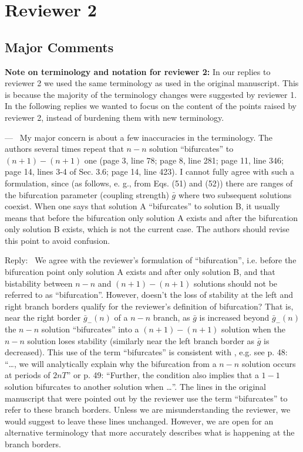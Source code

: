 \documentclass[utf8]{article}
\newcounter{point}[section]
\newenvironment{point}
{\refstepcounter{point} \bigskip \noindent {\textbf{Point~P\thesubsection.\arabic{point}} } ---\ }
{\par }
\newenvironment{reply}
{\medskip \noindent Reply:\  }
		{\medskip}
\begin{document}
\section{Reviewer 2}
\label{sec:r2}
\subsection{Major Comments}
\textbf{Note on terminology and notation for reviewer 2:} In our replies to reviewer 2 we used the same terminology as used in the original manuscript. This is because the majority of the terminology changes were suggested by reviewer 1. In the following replies we wanted to focus on the content of the points raised by reviewer 2, instead of burdening them with new terminology.
\setcounter{point}{0}

\begin{point}
My major concern is about a few inaccuracies in the terminology.
The authors several times repeat that $n - n$ solution ``bifurcates'' to $(n + 1) - (n + 1)$ one (page 3, line 78; page 8, line 281; page 11, line 346; page 14, lines 3-4 of Sec. 3.6; page 14, line 423).
I cannot fully agree with such a formulation, since (as follows, e. g., from Eqs. (51) and (52)) there are ranges of the bifurcation parameter (coupling strength) $\bar g$ where two subsequent solutions coexist.
When one says that solution A ``bifurcates'' to solution B, it usually means that before the bifurcation only solution A exists and after the bifurcation only solution B exists, which is not the current case.
The authors should revise this point to avoid confusion.
\end{point}

\begin{reply}
We agree with the reviewer's formulation of ``bifurcation'', i.e. before the bifurcation point only solution A exists and after only solution B, and that bistability between $n-n$ and $(n+1)-(n+1)$ solutions should not be referred to as ``bifurcation''.
However, doesn't the loss of stability at the left and right branch borders qualify for the reviewer's definition of bifurcation?
That is, near the right border $\bar g_{-}(n)$ of a $n-n$ branch, as $\bar g$ is increased beyond $\bar g_{-}(n)$ the $n-n$ solution ``bifurcates'' into a $(n+1)-(n+1)$ solution when the $n-n$ solution loses stability (similarly near the left branch border as $\bar g$ is decreased).
This use of the term ``bifurcates'' is consistent with \cite{bose2011}, e.g. see p. 48: ``\dots, we will analytically explain why the bifurcation from a $n-n$ solution occurs at periods of $2nT$'' or p. 49: ``Further, the condition also implies that a $1-1$ solution bifurcates to another solution when \dots''.
The lines in the original manuscript that were pointed out by the reviewer use the term ``bifurcates'' to refer to these branch borders.
Unless we are misunderstanding the reviewer, we would suggest to leave these lines unchanged.
However, we are open for an alternative terminology that more accurately describes what is happening at the branch borders.
\end{reply}
\end{document}
